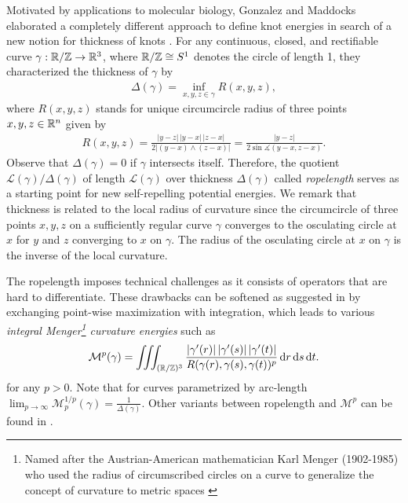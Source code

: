 Motivated by applications to molecular biology, Gonzalez and Maddocks elaborated a completely different approach to define knot energies in search of a new notion for thickness of knots \cite{GonzalesMaddocks:1999:GlobalCurvature}.
For any continuous, closed, and rectifiable curve $\gamma:\mathbb{R}/\mathbb{Z} \rightarrow \mathbb{R}^3$, where $\mathbb{R} /\mathbb{Z} \cong S^1$ denotes the circle of length 1, they characterized the thickness of  $\gamma$  by
\begin{align*}
\Delta (\gamma) = \inf_{x,y,z\in \gamma } R(x,y,z) ,
\end{align*}
where $R(x,y,z)$ stands for unique circumcircle radius of three points $x,y,z\in \mathbb{R}^n$ given by 
\begin{align*}
R(x,y,z) = \frac{|y-z|\, |y-x| \, |z-x|}{2 |(y-x)\wedge (z-x)|} = \frac{|y-z|}{2 \sin \measuredangle (y-x,z-x)}.
\end{align*}
Observe that $\Delta(\gamma) = 0$ if $\gamma$ intersects itself. Therefore, the quotient  $\mathcal{L}(\gamma) / \Delta(\gamma)$ of length $\mathcal{L}(\gamma)$ over thickness $\Delta(\gamma)$ called \emph{ropelength} serves as a starting point for new self-repelling potential energies.
We remark that thickness is related to the
local radius of curvature since the circumcircle of three points $x,y,z$ on a sufficiently regular curve $\gamma$ converges to the osculating circle at $x$ for $y$ and $z$ converging to $ x$ on $\gamma$. The radius of the osculating circle at $x$ on $\gamma$  is the inverse of the local curvature. 

The ropelength imposes technical challenges as it consists of operators that are hard to differentiate. These drawbacks can be softened as suggested in \cite{GonzalesMaddocks:1999:GlobalCurvature} by exchanging point-wise maximization with integration, which leads to various \emph{integral Menger\footnote{Named after the Austrian-American mathematician Karl Menger (1902-1985) who used the radius of circumscribed circles on a curve to generalize the concept of curvature to metric spaces \cite{Menger:1930:UntersuchungenUeberAllgemeineMetrik}} curvature energies}
such as
\begin{align}\label{def:intMengcurv}
\mathcal{M}^{p}(\gamma) =   \iiint_{(\mathbb{R}/\mathbb{Z})^3} \frac{|\gamma'(r)| \, |\gamma'(s)| \, |\gamma'(t)|}{R(\gamma(r),\gamma(s), \gamma(t))^p} \,\mathrm{d} r \,\mathrm{d} s\,\mathrm{d} t.
\end{align}
for any $p>0$. Note that for curves parametrized by arc-length $\lim_{p\rightarrow \infty} \mathcal{M}_p^{1/p} (\gamma) = \frac{1}{\Delta(\gamma)}$. Other variants between ropelength and $\mathcal M^p$ can be found in \cite{GonzalesMaddocks:1999:GlobalCurvature}.

